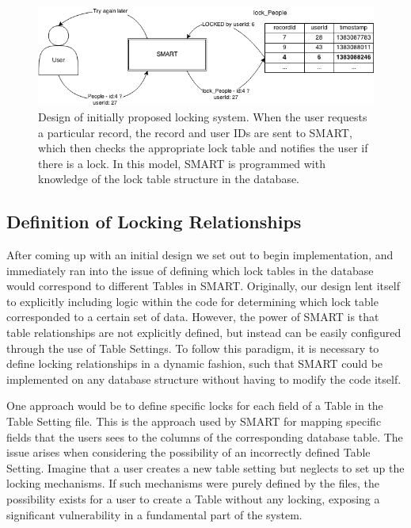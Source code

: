 \documentclass[12pt]{article}
\begin{document}
\begin{center}
\begin{figure}[h]
    \centering
    \centerline{\includegraphics[width=7in]{diagrams/InitialLockDesign.png}}
    \begin{spacing}{1.0}\caption{Design of initially proposed locking system. When the user requests a particular record, the record and user IDs are sent to SMART, which then checks the appropriate lock table and notifies the user if there is a lock. In this model, SMART is programmed with knowledge of the lock table structure in the database.}\end{spacing}
    \vspace{-20pt}
\end{figure}
\end{center}

\subsection{Definition of Locking Relationships}

After coming up with an initial design we set out to begin implementation, and immediately ran into the issue of defining which lock tables in the database would correspond to different Tables in SMART. Originally, our design lent itself to explicitly including logic within the code for determining which lock table corresponded to a certain set of data. However, the power of SMART is that table relationships are not explicitly defined, but instead can be easily configured through the use of Table Settings. To follow this paradigm, it is necessary to define locking relationships in a dynamic fashion, such that SMART could be implemented on any database structure without having to modify the code itself.

One approach would be to define specific locks for each field of a Table in the Table Setting file. This is the approach used by SMART for mapping specific fields that the users sees to the columns of the corresponding database table. The issue arises when considering the possibility of an incorrectly defined Table Setting. Imagine that a user creates a new table setting but neglects to set up the locking mechanisms. If such mechanisms were purely defined by the files, the possibility exists for a user to create a Table without any locking, exposing a significant vulnerability in a fundamental part of the system.
\end{document}
